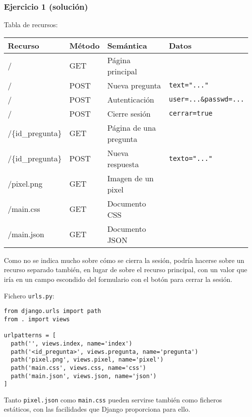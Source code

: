 \subsubsection{Ejercicio 1 (solución)}

Tabla de recursos:
\vspace{.4cm}

\begin{tabular}{|l|l|l|l|}
  \hline
  Recurso & Método & Semántica & Datos \\ \hline\hline
  /       & GET    & Página principal & \\
  /       & POST   & Nueva pregunta & \texttt{text="..."} \\
  /       & POST   & Autenticación & \texttt{user=...\&passwd=...} \\
  /       & POST   & Cierre sesión & \texttt{cerrar=true} \\
  /\{id\_pregunta\} & GET & Página de una pregunta & \\
  /\{id\_pregunta\} & POST & Nueva respuesta & \texttt{texto="..."} \\
  /pixel.png & GET & Imagen de un pixel & \\
  /main.css & GET & Documento CSS &  \\
  /main.json & GET & Documento JSON &  \\
  \hline
\end{tabular}

Como no se indica mucho sobre cómo se cierra la sesión, podría hacerse sobre un recurso separado también, en lugar de sobre el recurso principal, con un valor que iría en un campo escondido del formulario con el botón para cerrar la sesión.

\vspace{.4cm}
Fichero \texttt{urls.py}:

\begin{verbatim}
from django.urls import path
from . import views

urlpatterns = [
  path('', views.index, name='index')
  path('<id_pregunta>', views.pregunta, name='pregunta')
  path('pixel.png', views.pixel, name='pixel')
  path('main.css', views.css, name='css')
  path('main.json', views.json, name='json')
]
\end{verbatim}

Tanto \texttt{pixel.json} como \texttt{main.css} pueden servirse también como ficheros estáticos, con las facilidades que Django proporciona para ello.


